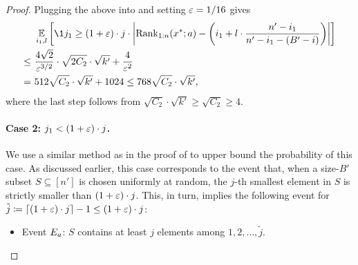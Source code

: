 \begin{proof}
Plugging the above into  and setting $\varepsilon = 1/16$ gives
\begin{equation}\begin{split}\label{eq:case-1-final-bound}
    &~\Ex{i_1, l}{\1{j_1 \ge (1+\eps)\cdot j}\cdot\left|\rank_{{1:n}}(x^*; a) - \left(i_1+l\cdot \frac{n'-i_1}{n'-i_1-(B'-i)}\right)\right|}\\
\le &~ \frac{4\sqrt{2}}{\eps^{3/2}}\cdot \sqrt{2C_2}\cdot\sqrt{k'} + \frac{4}{\eps^2}\\
=   &~512\sqrt{C_2}\cdot\sqrt{k'} + 1024
\le 768\sqrt{C_2}\cdot\sqrt{k'},
\end{split}\end{equation}
where the last step follows from $\sqrt{C_2} \cdot \sqrt{k'} \ge \sqrt{C_2} \ge 4$.

\paragraph{Case 2: $j_1 < (1+\varepsilon)\cdot j$.} We use a similar method as in the proof of  to upper bound the probability of this case. As discussed earlier, this case corresponds to the event that, when a size-$B'$ subset $S \subseteq [n']$ is chosen uniformly at random, the $j$-th smallest element in $S$ is strictly smaller than $(1 + \varepsilon)\cdot j$. This, in turn, implies the following event for $\tilde j \coloneqq \lceil (1 + \varepsilon)\cdot j \rceil - 1 \le (1 + \varepsilon)\cdot j$:
\begin{itemize}
    \item Event $E_a$: $S$ contains at least $j$ elements among $1, 2, \ldots, \tilde j$.
\end{itemize}


\end{proof}
